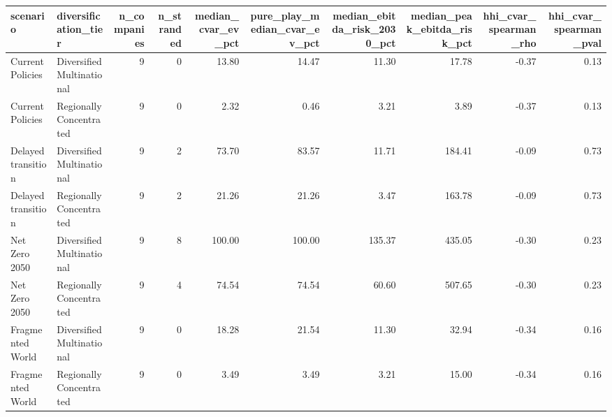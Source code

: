 \begin{tabular}{llrrrrrrrr}
\toprule
scenario & diversification_tier & n_companies & n_stranded & median_cvar_ev_pct & pure_play_median_cvar_ev_pct & median_ebitda_risk_2030_pct & median_peak_ebitda_risk_pct & hhi_cvar_spearman_rho & hhi_cvar_spearman_pval \\
\midrule
Current Policies & Diversified Multinational & 9 & 0 & 13.80 & 14.47 & 11.30 & 17.78 & -0.37 & 0.13 \\
Current Policies & Regionally Concentrated & 9 & 0 & 2.32 & 0.46 & 3.21 & 3.89 & -0.37 & 0.13 \\
Delayed transition & Diversified Multinational & 9 & 2 & 73.70 & 83.57 & 11.71 & 184.41 & -0.09 & 0.73 \\
Delayed transition & Regionally Concentrated & 9 & 2 & 21.26 & 21.26 & 3.47 & 163.78 & -0.09 & 0.73 \\
Net Zero 2050 & Diversified Multinational & 9 & 8 & 100.00 & 100.00 & 135.37 & 435.05 & -0.30 & 0.23 \\
Net Zero 2050 & Regionally Concentrated & 9 & 4 & 74.54 & 74.54 & 60.60 & 507.65 & -0.30 & 0.23 \\
Fragmented World & Diversified Multinational & 9 & 0 & 18.28 & 21.54 & 11.30 & 32.94 & -0.34 & 0.16 \\
Fragmented World & Regionally Concentrated & 9 & 0 & 3.49 & 3.49 & 3.21 & 15.00 & -0.34 & 0.16 \\
\bottomrule
\end{tabular}
